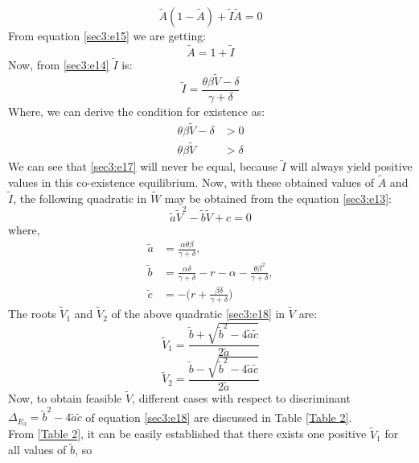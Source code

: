 \documentclass[12pt]{article}
\numberwithin{equation}{section}
\begin{document}
\begin{enumerate}[i)]
\begin{equation}\label{sec3:e15}
\tilde A(1- \tilde A)+\tilde I \tilde A=0
\end{equation}
From equation \eqref{sec3:e15} we are getting:
\begin{equation}\label{sec3:e16}
\tilde A=1+\tilde I
\end{equation}
Now, from \eqref{sec3:e14} $\tilde I$ is:
\begin{equation}\label{sec3:e16}
\tilde I = \frac{\theta \beta \tilde V-\delta}{\gamma +\delta}
\end{equation}
Where, we can derive the condition for existence as:
\begin{align}\label{sec3:e17}
\theta \beta \tilde V-\delta &>0\\
\theta \beta \tilde V &>\delta
\end{align}
We can see that \eqref{sec3:e17} will never be equal, because $\tilde I$ will always yield positive values in this co-existence equilibrium.
Now, with these obtained values of $\tilde A$ and $\tilde I$, the following quadratic in $\tilde W$ may be obtained from the equation \eqref{sec3:e13}:
\begin{equation}\label{sec3:e18}
\tilde a \tilde V^2 - \tilde b \tilde V + c =0
\end{equation}
where,
\begin{align}\label{sec3:e19}
\tilde a &= \frac{\alpha \theta \beta}{\gamma +\delta},\\
\tilde b &= \frac{\alpha \delta}{\gamma + \delta} -r-\alpha -\frac{\theta \beta^2}{\gamma + \delta},\\
\tilde c &= -\bigg( r+\frac{\beta \delta}{\gamma + \delta}\bigg)
\end{align}
The roots $\tilde V_1$ and $\tilde V_2$ of the above quadratic \eqref{sec3:e18} in $\tilde V$ are:
\begin{equation}\label{sec3:e20}
\tilde V_1 = \frac{\tilde b + \sqrt{\tilde b^2 - 4\tilde a \tilde c}}{2 \tilde a}
\end{equation}
\begin{equation}\label{sec3:e21}
\tilde V_2 = \frac{\tilde b - \sqrt{\tilde b^2 - 4\tilde a \tilde c}}{2 \tilde a}
\end{equation}
  Now, to obtain feasible $\tilde V$, different cases with respect to discriminant $\Delta_{E_3}=\tilde b^{2}-4\tilde a \tilde c$ of equation \eqref{sec3:e18} are discussed in Table \ref{Table 2}. \\
From \ref{Table 2}, it can be easily established that there exists one positive $\tilde V_1$ for all values of $\tilde b$, so\\

\end{enumerate}
\end{document}
